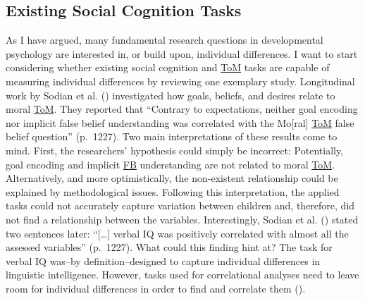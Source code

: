 \documentclass[
]{scrbook}
\begin{document}
\subsection{Existing Social Cognition Tasks}\label{existing-social-cognition-tasks}

As I have argued, many fundamental research questions in developmental psychology are interested in, or build upon, individual differences. I want to start considering whether existing social cognition and \hyperref[acronyms_ToM]{ToM} tasks are capable of measuring individual differences by reviewing one exemplary study. Longitudinal work by Sodian et al. () investigated how goals, beliefs, and desires relate to moral \hyperref[acronyms_ToM]{ToM}. They reported that ``Contrary to expectations, neither goal encoding nor implicit false belief understanding was correlated with the Mo{[}ral{]} \hyperref[acronyms_ToM]{ToM} false belief question'' (p.~1227). Two main interpretations of these results come to mind. First, the researchers' hypothesis could simply be incorrect: Potentially, goal encoding and implicit \hyperref[acronyms_FB]{FB} understanding are not related to moral \hyperref[acronyms_ToM]{ToM}. Alternatively, and more optimistically, the non-existent relationship could be explained by methodological issues. Following this interpretation, the applied tasks could not accurately capture variation between children and, therefore, did not find a relationship between the variables. Interestingly, Sodian et al. () stated two sentences later: ``{[}\ldots{]} verbal IQ was positively correlated with almost all the assessed variables'' (p.~1227). What could this finding hint at? The task for verbal IQ was\thinspace --\thinspace by definition\thinspace --\thinspace designed to capture individual differences in linguistic intelligence. However, tasks used for correlational analyses need to leave room for individual differences in order to find and correlate them ().
\end{document}
